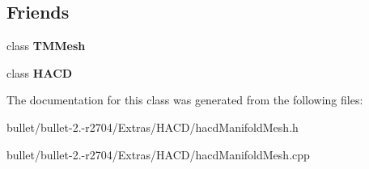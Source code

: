 \subsection*{Friends}
\begin{DoxyCompactItemize}
\item 
\hypertarget{class_h_a_c_d_1_1_material_a444d6b56620e89d598962bee57ddd380}{class {\bfseries T\+M\+Mesh}}\label{class_h_a_c_d_1_1_material_a444d6b56620e89d598962bee57ddd380}

\item 
\hypertarget{class_h_a_c_d_1_1_material_ab3497bc7797561d0c79ecef2f462e43a}{class {\bfseries H\+A\+C\+D}}\label{class_h_a_c_d_1_1_material_ab3497bc7797561d0c79ecef2f462e43a}

\end{DoxyCompactItemize}


The documentation for this class was generated from the following files\+:\begin{DoxyCompactItemize}
\item 
bullet/bullet-\/2.-\/r2704/\+Extras/\+H\+A\+C\+D/hacd\+Manifold\+Mesh.\+h\item 
bullet/bullet-\/2.-\/r2704/\+Extras/\+H\+A\+C\+D/hacd\+Manifold\+Mesh.\+cpp\end{DoxyCompactItemize}
